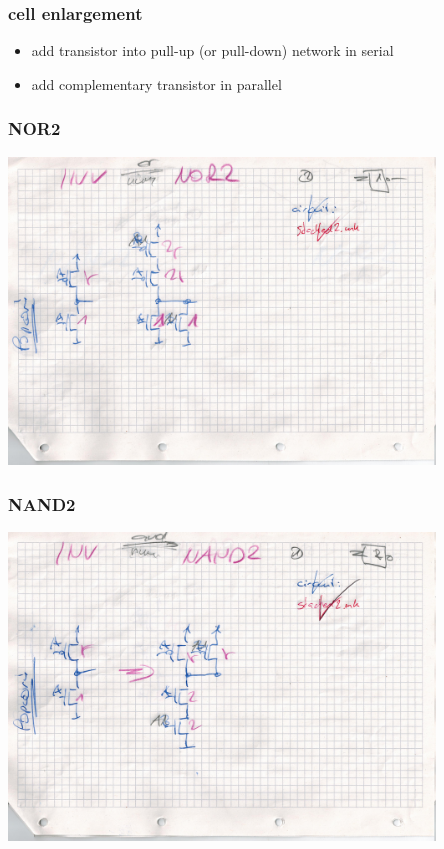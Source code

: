 \documentclass[aspectratio=169]{beamer}
\begin{document}

\begin{frame}
\frametitle{cell enlargement}
    \begin{itemize}
        \item add transistor into pull-up (or pull-down) network in serial
        \item add complementary transistor in parallel
    \end{itemize}
\end{frame}


\begin{frame}
\frametitle{NOR2}
    \begin{center}
        \includegraphics[width=0.85\textwidth]{NOR2.jpg}
    \end{center}
\end{frame}


\begin{frame}
\frametitle{NAND2}
    \begin{center}
        \includegraphics[width=0.85\textwidth]{NAND2.jpg}
    \end{center}
\end{frame}
\end{document}
